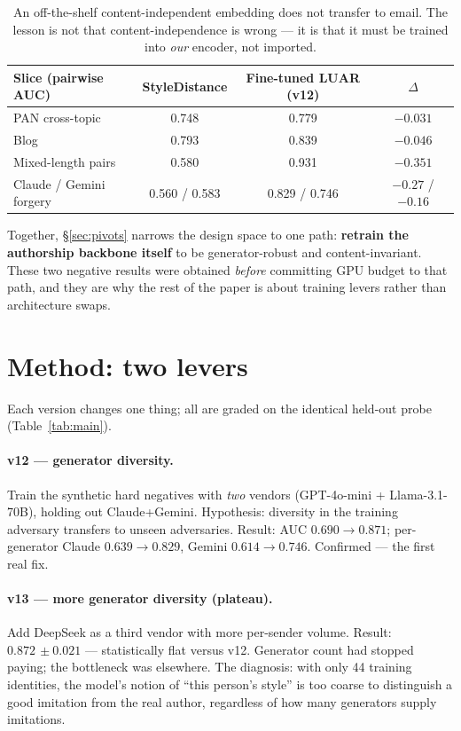 \documentclass[11pt]{article}
\newcommand{\ms}[2]{\ensuremath{#1{\scriptstyle\,\pm #2}}}
\begin{document}
\begin{table}[h]
\centering
\small
\begin{tabular}{lccc}
\toprule
Slice (pairwise AUC) & StyleDistance & Fine-tuned LUAR (v12) & $\Delta$ \\
\midrule
PAN cross-topic & 0.748 & 0.779 & $-0.031$ \\
Blog & 0.793 & 0.839 & $-0.046$ \\
Mixed-length pairs & 0.580 & 0.931 & $-0.351$ \\
Claude / Gemini forgery & 0.560 / 0.583 & 0.829 / 0.746 & $-0.27$ / $-0.16$ \\
\bottomrule
\end{tabular}
\caption{An off-the-shelf content-independent embedding does not transfer to email. The lesson is
not that content-independence is wrong --- it is that it must be trained into \emph{our} encoder,
not imported.}
\label{tab:styledistance}
\end{table}

Together, \S\ref{sec:pivots} narrows the design space to one path: \textbf{retrain the authorship
backbone itself} to be generator-robust and content-invariant. These two negative results were
obtained \emph{before} committing GPU budget to that path, and they are why the rest of the paper
is about training levers rather than architecture swaps.

\section{Method: two levers}
\label{sec:method}

Each version changes one thing; all are graded on the identical held-out probe
(Table~\ref{tab:main}).

\paragraph{v12 --- generator diversity.} Train the synthetic hard negatives with \emph{two} vendors
(GPT-4o-mini + Llama-3.1-70B), holding out Claude+Gemini. Hypothesis: diversity in the training
adversary transfers to unseen adversaries. Result: AUC $0.690 \to 0.871$; per-generator
Claude $0.639 \to 0.829$, Gemini $0.614 \to 0.746$. Confirmed --- the first real fix.

\paragraph{v13 --- more generator diversity (plateau).} Add DeepSeek as a third vendor with more
per-sender volume. Result: \ms{0.872}{0.021} --- statistically flat versus v12. Generator count had
stopped paying; the bottleneck was elsewhere. The diagnosis: with only 44 training identities, the
model's notion of ``this person's style'' is too coarse to distinguish a good imitation from the
real author, regardless of how many generators supply imitations.
\end{document}
